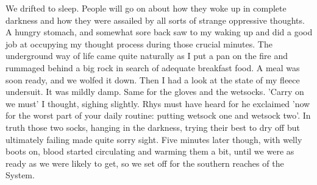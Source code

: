 We drifted to sleep. People will go on about how they woke up in complete darkness and how they were assailed by all sorts of strange oppressive thoughts. A hungry stomach, and somewhat sore back saw to my waking up and did a good job at occupying my thought process during those crucial minutes. The underground way of life came quite naturally as I put a pan on the fire and rummaged behind a big rock in search of adequate breakfast food. A meal was soon ready, and we wolfed it down. Then I had a look at the state of my fleece undersuit. It was mildly damp. Same for the gloves and the wetsocks. 'Carry on we must' I thought, sighing slightly. Rhys must have heard for he exclaimed 'now for the worst part of your daily routine: putting wetsock one and wetsock two'. In truth those two socks, hanging in the darkness, trying their best to dry off but ultimately failing made quite sorry sight. Five minutes later though, with welly boots on, blood started circulating and warming them a bit, until we were as ready as we were likely to get, so we set off for the southern reaches of the System. 
\begin{figure}[t!]
\end{figure}


